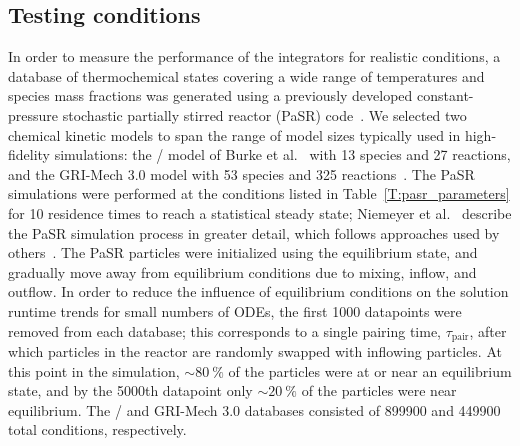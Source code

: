 \documentclass[preprint,review,11pt]{elsarticle}
\begin{document}
\subsection{Testing conditions}
\label{S:pasr_conditions}

In order to measure the performance of the integrators for realistic conditions, a database of thermochemical states covering a wide range of temperatures and species mass fractions was generated using a previously developed constant-pressure stochastic partially stirred reactor (PaSR) code~\cite{Niemeyer:2016aa,niemeyer_2016_51139}.
We selected two chemical kinetic models to span the range of model sizes typically used in high-fidelity simulations: the \slash{} model of Burke et al.~\cite{Burke:2011fh} with 13 species and 27 reactions, and the GRI-Mech 3.0 model with 53 species and 325 reactions~\cite{smith_gri-mech_30}.
The PaSR simulations were performed at the conditions listed in Table~\ref{T:pasr_parameters} for 10 residence times to reach a statistical steady state; Niemeyer et al.~\cite{Niemeyer:2016aa} describe the PaSR simulation process in greater detail, which follows approaches used by others~\cite{Chen:1997ta,Pope:1997wu,Ren:2014cd}.
The PaSR particles were initialized using the equilibrium state, and gradually move away from equilibrium conditions due to mixing, inflow, and outflow.
In order to reduce the influence of equilibrium conditions on the solution runtime trends for small numbers of ODEs, the first \num{1000} datapoints were removed from each database; this corresponds to a single pairing time, $\tau_\text{pair}$, after which particles in the reactor are randomly swapped with inflowing particles.
At this point in the simulation, $\sim\SI{80}{\percent}$ of the particles were at or near an equilibrium state, and by the \num{5000}th datapoint only $\sim\SI{20}{\percent}$ of the particles were near equilibrium.
The \slash{} and GRI-Mech 3.0 databases consisted of \num{899900} and \num{449900} total conditions, respectively.
\end{document}
